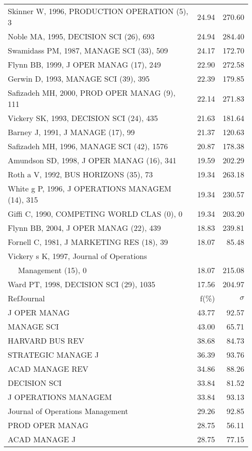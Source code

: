 \documentclass[a4paper,11pt]{report}
\begin{document}
\begin{landscape}
\begin{table}[!ht]
{\begin{tabular}{|l r r|}
Skinner W, 1996, PRODUCTION OPERATION (5), 3 & 24.94 & 270.60\\
Noble MA, 1995, DECISION SCI (26), 693 & 24.94 & 284.40\\
Swamidass PM, 1987, MANAGE SCI (33), 509 & 24.17 & 172.70\\
Flynn BB, 1999, J OPER MANAG (17), 249 & 22.90 & 272.58\\
Gerwin D, 1993, MANAGE SCI (39), 395 & 22.39 & 179.85\\
Safizadeh MH, 2000, PROD OPER MANAG (9), 111 & 22.14 & 271.83\\
Vickery SK, 1993, DECISION SCI (24), 435 & 21.63 & 181.64\\
Barney J, 1991, J MANAGE (17), 99 & 21.37 & 120.63\\
Safizadeh MH, 1996, MANAGE SCI (42), 1576 & 20.87 & 178.38\\
Amundson SD, 1998, J OPER MANAG (16), 341 & 19.59 & 202.29\\
Roth a V, 1992, BUS HORIZONS (35), 73 & 19.34 & 263.18\\
White g P, 1996, J OPERATIONS MANAGEM (14), 315 & 19.34 & 230.57\\
Giffi C, 1990, COMPETING WORLD CLAS (0), 0 & 19.34 & 203.20\\
Flynn BB, 2004, J OPER MANAG (22), 439 & 18.83 & 239.81\\
Fornell C, 1981, J MARKETING RES (18), 39 & 18.07 & 85.48\\
Vickery s K, 1997, Journal of Operations &  & \\
$\quad$ Management (15), 0 & 18.07 & 215.08\\
Ward PT, 1998, DECISION SCI (29), 1035 & 17.56 & 204.97\\
\hline
\hline
RefJournal & f(\%) & $\sigma$\\
\hline
J OPER MANAG & 43.77 & 92.57\\
MANAGE SCI & 43.00 & 65.71\\
HARVARD BUS REV & 38.68 & 84.73\\
STRATEGIC MANAGE J & 36.39 & 93.76\\
ACAD MANAGE REV & 34.86 & 88.26\\
DECISION SCI & 33.84 & 81.52\\
J OPERATIONS MANAGEM & 33.84 & 93.13\\
Journal of Operations Management & 29.26 & 92.85\\
PROD OPER MANAG & 28.75 & 56.11\\
ACAD MANAGE J & 28.75 & 77.15\\
\hline
\end{tabular}
}
\end{table}


\end{landscape}
\end{document}
